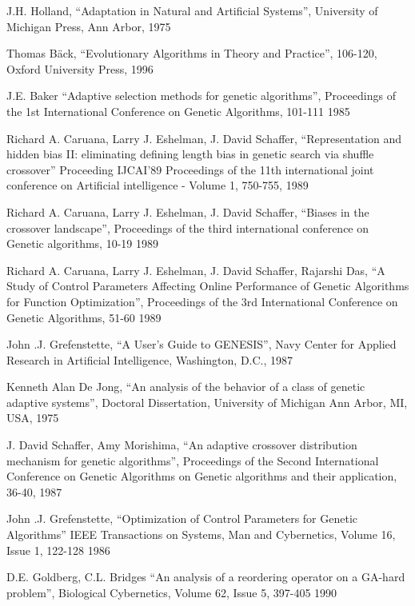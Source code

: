 \documentclass[m,bachelor,binding,oneside,palatino]{thesisdifctunl}
\begin{document}
\begin{thebibliography}{9}
	J.H. Holland,
	"`Adaptation in Natural and Artificial Systems"',
	University of Michigan Press,
	Ann Arbor, 
	1975
	
	Thomas Bäck,
	"`Evolutionary Algorithms in Theory and Practice"', 106-120,
	Oxford University Press,
	1996
	
	J.E. Baker
	"`Adaptive selection methods for genetic algorithms"',
	Proceedings of the 1st International Conference on Genetic Algorithms, 101-111
	1985
	
	Richard A. Caruana, Larry J. Eshelman, J. David Schaffer,
	"`Representation and hidden bias II: eliminating defining length bias in genetic search via shuffle crossover"'
	Proceeding IJCAI'89 Proceedings of the 11th international joint conference on Artificial intelligence - Volume 1, 750-755,
	1989
	
	Richard A. Caruana, Larry J. Eshelman, J. David Schaffer,
	"`Biases in the crossover landscape"',
	Proceedings of the third international conference on Genetic algorithms, 10-19
	1989
	
	Richard A. Caruana, Larry J. Eshelman, J. David Schaffer, Rajarshi Das,
	"`A Study of Control Parameters Affecting Online Performance of Genetic Algorithms for Function Optimization"',
	Proceedings of the 3rd International Conference on Genetic Algorithms, 51-60
	1989
	
	John .J. Grefenstette,
	"`A User's Guide to GENESIS"',
	Navy Center for Applied Research in Artificial Intelligence,
	Washington, D.C.,
	1987
	
	Kenneth Alan De Jong,
	"`An analysis of the behavior of a class of genetic adaptive systems"',
	Doctoral Dissertation, 
	University of Michigan Ann Arbor, MI, USA,
	1975 
	
	J. David Schaffer,	Amy Morishima,
	"`An adaptive crossover distribution mechanism for genetic algorithms"',
	Proceedings of the Second International Conference on Genetic Algorithms on Genetic algorithms and their application, 36-40,
	1987

	John .J. Grefenstette,
	"`Optimization of Control Parameters for Genetic Algorithms"'
	IEEE Transactions on Systems, Man and Cybernetics, Volume 16, Issue 1, 122-128
	1986
	
	D.E. Goldberg, C.L. Bridges
	"`An analysis of a reordering operator on a GA-hard problem"',
	Biological Cybernetics, Volume 62, Issue 5, 397-405
	1990
	

\end{thebibliography}
\end{document}
